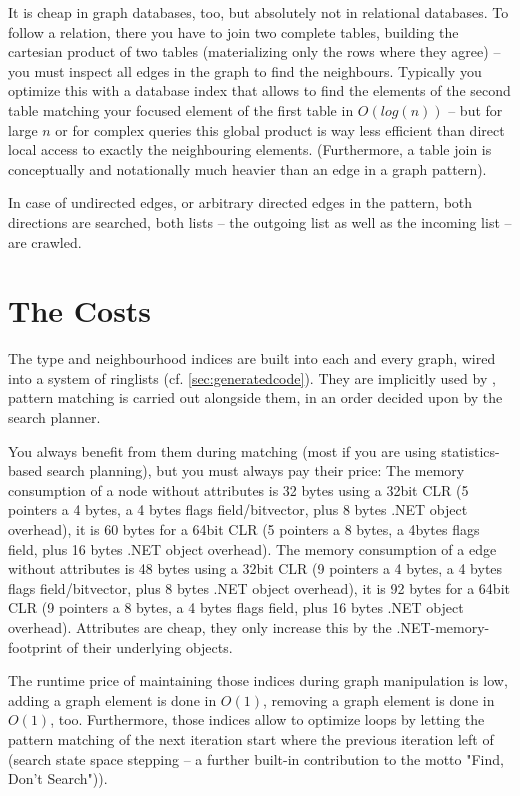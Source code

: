 It is cheap in graph databases, too, but absolutely not in relational databases.
To follow a relation, there you have to join two complete tables, building the cartesian product of two tables (materializing only the rows where they agree) -- you must inspect all edges in the graph to find the neighbours.
Typically you optimize this with a database index that allows to find the elements of the second table matching your focused element of the first table in $O(log(n))$ -- but for large $n$ or for complex queries this global product is way less efficient than direct local access to exactly the neighbouring elements.
(Furthermore, a table join is conceptually and notationally much heavier than an edge in a graph pattern).

In case of undirected edges, or arbitrary directed edges in the pattern, both directions are searched,
both lists -- the outgoing list as well as the incoming list -- are crawled.

\section{The Costs}\label{sec:performancememory} 
The type and neighbourhood indices are built into each and every \GrG{} graph, wired into a system of ringlists (cf. \ref{sec:generatedcode}).
They are implicitly used by \GrG{}, pattern matching is carried out alongside them, in an order decided upon by the search planner. 

You always benefit from them during matching (most if you are using statistics-based search planning), but you must always pay their price:
The memory consumption of a \GrG{} node without attributes is 32 bytes using a 32bit CLR (5 pointers a 4 bytes, a 4 bytes flags field/bitvector, plus 8 bytes .NET object overhead), it is 60 bytes for a 64bit CLR (5 pointers a 8 bytes, a 4bytes flags field, plus 16 bytes .NET object overhead).
The memory consumption of a \GrG{} edge without attributes is 48 bytes using a 32bit CLR (9 pointers a 4 bytes, a 4 bytes flags field/bitvector, plus 8 bytes .NET object overhead), it is 92 bytes for a 64bit CLR (9 pointers a 8 bytes, a 4 bytes flags field, plus 16 bytes .NET object overhead).
Attributes are cheap, they only increase this by the .NET-memory-footprint of their underlying objects.

The runtime price of maintaining those indices during graph manipulation is low, adding a graph element is done in $O(1)$, removing a graph element is done in $O(1)$, too. 
Furthermore, those indices allow to optimize loops by letting the pattern matching of the next iteration start where the previous iteration left of (search state space stepping -- a further built-in contribution to the motto "Find, Don't Search")).

